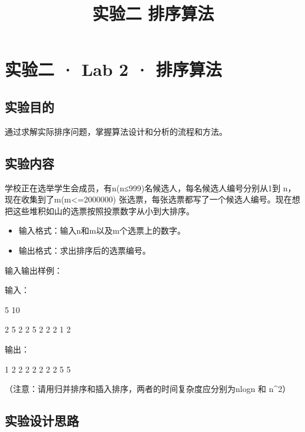 \documentclass[11pt]{article}
\title{实验二 排序算法}
\providecommand{\tightlist}{%
      \setlength{\itemsep}{0pt}\setlength{\parskip}{0pt}}
\begin{document}
    
    \maketitle
    
    

    
    \hypertarget{ux5b9eux9a8cux4e8c-lab-2-ux6392ux5e8fux7b97ux6cd5}{%
\section{实验二 · Lab 2 ·
排序算法}\label{ux5b9eux9a8cux4e8c-lab-2-ux6392ux5e8fux7b97ux6cd5}}

\hypertarget{ux5b9eux9a8cux76eeux7684}{%
\subsection{实验目的}\label{ux5b9eux9a8cux76eeux7684}}

通过求解实际排序问题，掌握算法设计和分析的流程和方法。

\hypertarget{ux5b9eux9a8cux5185ux5bb9}{%
\subsection{实验内容}\label{ux5b9eux9a8cux5185ux5bb9}}

学校正在选举学生会成员，有n(n≤999)名候选人，每名候选人编号分别从1到
n，现在收集到了m(m\textless=2000000)
张选票，每张选票都写了一个候选人编号。现在想把这些堆积如山的选票按照投票数字从小到大排序。

\begin{itemize}
\tightlist
\item
  输入格式：输入n和m以及m个选票上的数字。
\item
  输出格式：求出排序后的选票编号。
\end{itemize}

输入输出样例：

输入：

5 10

2 5 2 2 5 2 2 2 1 2

输出：

1 2 2 2 2 2 2 2 5 5

（注意：请用归并排序和插入排序，两者的时间复杂度应分别为nlogn 和
n\^{}2）

\hypertarget{ux5b9eux9a8cux8bbeux8ba1ux601dux8def}{%
\subsection{实验设计思路}\label{ux5b9eux9a8cux8bbeux8ba1ux601dux8def}}
\end{document}
